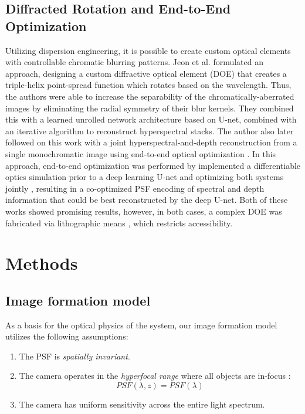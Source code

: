 \documentclass{article}
\begin{document}
\subsection{Diffracted Rotation and End-to-End Optimization}
Utilizing dispersion engineering, it is possible to create custom optical elements with controllable chromatic blurring patterns. Jeon et al. \cite{jeon2019compact} formulated an approach, designing a custom diffractive optical element (DOE) that creates a triple-helix point-spread function which rotates based on the wavelength. Thus, the authors were able to increase the separability of the chromatically-aberrated images by eliminating the radial symmetry of their blur kernels. They combined this with a learned unrolled network architecture based on U-net, combined with an iterative algorithm to reconstruct hyperspectral stacks. The author also later followed on this work with a joint hyperspectral-and-depth reconstruction from a single monochromatic image using end-to-end optical optimization \cite{baek2021single}. In this approach, end-to-end optimization was performed by implemented a differentiable optics simulation prior to a deep learning U-net and optimizing both systems jointly \cite{chakrabarti2016learning}\cite{zou2023advanced}, resulting in a co-optimized PSF encoding of spectral and depth information that could be best reconstructed by the deep U-net. Both of these works showed promising results, however, in both cases, a complex DOE was fabricated via lithographic means \cite{poleshchuk2010fabrication}, which restricts accessibility.

\section{Methods}

\subsection{Image formation model}

As a basis for the optical physics of the system, our image formation model utilizes the following assumptions:
\begin{enumerate}
    \item The PSF is \textit{spatially invariant}.
    \item The camera operates in the \textit{hyperfocal range} where all objects are in-focus \cite{kingslake1992optics}:
    \begin{equation}
        PSF(\lambda,z) = PSF(\lambda) 
    \end{equation}
    \item The camera has uniform sensitivity across the entire light spectrum.
\end{enumerate}
\end{document}

